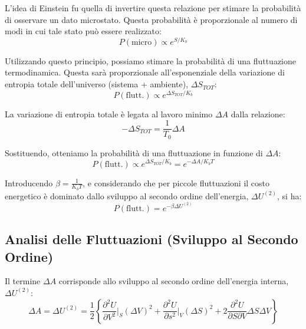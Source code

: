 L'idea di Einstein fu quella di invertire questa relazione per stimare la probabilità di osservare un dato microstato. Questa probabilità è proporzionale al numero di modi in cui tale stato può essere realizzato:
\begin{equation}
    P(\text{micro})\propto e^{S/K_{b}}
    \label{eq:prob_micro}
\end{equation}

Utilizzando questo principio, possiamo stimare la probabilità di una fluttuazione termodinamica. Questa sarà proporzionale all'esponenziale della variazione di entropia totale dell'universo (sistema + ambiente), $\Delta S_{TOT}$:
\begin{equation}
    P(\text{flutt.})\propto e^{\Delta S_{TOT}/K_{b}}
    \label{eq:prob_flutt_S}
\end{equation}

La variazione di entropia totale è legata al lavoro minimo $\Delta A$ dalla relazione:
\begin{equation}
    -\Delta S_{TOT}=\frac{1}{T_{0}}\Delta A
    \label{eq:delta_S_A}
\end{equation}

Sostituendo, otteniamo la probabilità di una fluttuazione in funzione di $\Delta A$:
\begin{equation}
    P(\text{flutt.})\propto e^{\Delta S_{TOT}/K_{b}}=e^{-\Delta A/K_{b}T}
    \label{eq:prob_flutt_A}
\end{equation}

Introducendo $\beta = \frac{1}{K_b T}$, e considerando che per piccole fluttuazioni il costo energetico è dominato dallo sviluppo al secondo ordine dell'energia, $\Delta U^{(2)}$, si ha:
\begin{equation}
    P(\text{flutt.})=e^{-\beta\Delta U^{(2)}}
    \label{eq:prob_flutt_U2}
\end{equation}

\subsection*{Analisi delle Fluttuazioni (Sviluppo al Secondo Ordine)}

Il termine $\Delta A$ corrisponde allo sviluppo al secondo ordine dell'energia interna, $\Delta U^{(2)}$:
\begin{equation}
    \Delta A=\Delta U^{(2)}=\frac{1}{2}\left\{\frac{\partial^{2}U}{\partial V^{2}}\bigg|_{S}(\Delta V)^{2}+\frac{\partial^{2}U}{\partial s^{2}}\bigg|_{V}(\Delta S)^{2}+2\frac{\partial^{2}U}{\partial S\partial V}\Delta S\Delta V\right\}
    \label{eq:delta_A_U2}
\end{equation}

